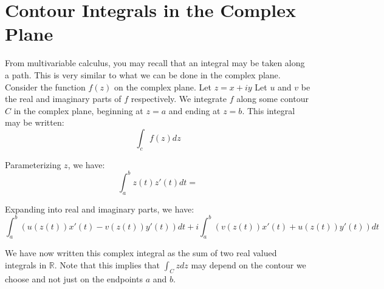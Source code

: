 

\section*{Contour Integrals in the Complex Plane}

From multivariable calculus, you may recall that an integral may be taken along a path. This is very similar to what we can be done in the complex plane. Consider the function $f(z)$ on the complex plane. Let $z=x+iy$ Let $u$ and $v$ be the real and imaginary parts of $f$ respectively. We integrate $f$ along some contour $C$ in the complex plane, beginning at $z=a$ and ending at $z=b$. This integral may be written: $$\int_c f(z)dz$$ 

Parameterizing $z$, we have: $$\int_a^b z(t)z'(t)dt=$$

Expanding into real and imaginary parts, we have:
$$\int_a^b (u(z(t))x'(t)-v(z(t))y'(t))dt +i \int_a^b(v(z(t))x'(t)+u(z(t))y'(t))dt$$

We have now written this complex integral as the sum of two real valued integrals in $\mathbb{R}$. Note that this implies that $\int_C z dz$ may depend on the contour we choose and not just on the endpoints $a$ and $b$.

